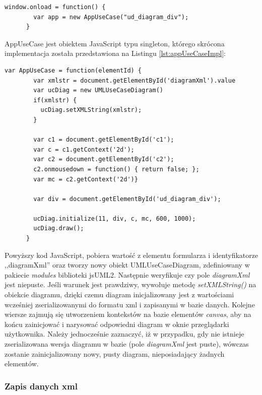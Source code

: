       \begin{lstlisting}[caption={Widok requriement/edit.gsp}, label={lst:appUseCase}]
      window.onload = function() {
        var app = new AppUseCase("ud_diagram_div");
      }

      \end{lstlisting}

      \newpage

      AppUseCase jest obiektem JavaScript typu singleton, którego skrócona implementacja została przedstawiona na Listingu \ref{lst:appUseCaseImpl}: 
    
      \begin{lstlisting}[caption={Implementacja obiektu JS AppUseCase}, label={lst:appUseCaseImpl}]
      var AppUseCase = function(elementId) { 
        var xmlstr = document.getElementById('diagramXml').value
        var ucDiag = new UMLUseCaseDiagram() 
        if(xmlstr) {
          ucDiag.setXMLString(xmlstr);
        }

        var c1 = document.getElementById('c1');
        var c = c1.getContext('2d');
        var c2 = document.getElementById('c2');
        c2.onmousedown = function() { return false; };
        var mc = c2.getContext('2d')}

        var div = document.getElementById('ud_diagram_div');

        ucDiag.initialize(11, div, c, mc, 600, 1000);
        ucDiag.draw();
      }
      \end{lstlisting}

      Powyższy kod JavaScript, pobiera wartość z elementu formularza i identyfikatorze ,,diagramXml'' oraz tworzy nowy obiekt UMLUseCaseDiagram, zdefiniowany w pakiecie \emph{modules} biblioteki jsUML2. Następnie weryfikuje czy pole \emph{diagramXml} jest niepuste. Jeśli warunek jest prawdziwy, wywołuje metodę \emph{setXMLString()} na obiekcie diagramu, dzięki czemu diagram inicjalizowany jest z wartościami wcześniej zserializowanymi do formatu xml i zapisanymi w bazie danych. Kolejne wiersze zajmują się utworzeniem kontekstów na bazie elementów \emph{canvas}, aby na końcu zainicjować i narysować odpowiedni diagram w oknie przeglądarki użytkownika. Należy jednocześnie zaznaczyć, iż w przypadku, gdy nie istnieje zserializowana wersja diagramu w bazie (pole \emph{diagramXml} jest puste), wówczas zostanie zainicjalizowany nowy, pusty diagram, nieposiadający żadnych elementów. 

      \subsubsection{Zapis danych xml}

